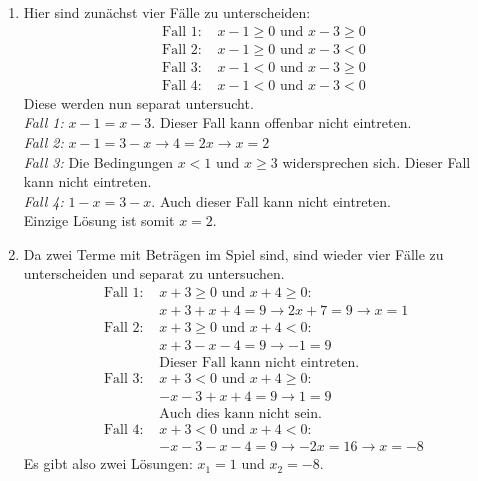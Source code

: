 \begin{enumerate}[label=\alph*)]
  \item Hier sind zunächst vier Fälle zu unterscheiden:
    \begin{align*}
      \text{Fall 1: } &x - 1 \geq 0 \text{ und } x - 3 \geq 0\\
      \text{Fall 2: } &x - 1 \geq 0 \text{ und } x - 3 < 0\\
      \text{Fall 3: } &x - 1 < 0 \text{ und } x - 3 \geq 0\\
      \text{Fall 4: } &x - 1 < 0 \text{ und } x - 3 < 0
    \end{align*}
    Diese werden nun separat untersucht.\\
    \textit{Fall 1: } $x - 1 = x - 3$. Dieser Fall kann offenbar nicht eintreten.\\
    \textit{Fall 2: } $x - 1 = 3 - x \rightarrow 4 = 2x \rightarrow x = 2$\\
    \textit{Fall 3: } Die Bedingungen $x < 1$ und $x \geq 3$ widersprechen sich. Dieser Fall kann nicht eintreten.\\
    \textit{Fall 4: } $1 - x = 3 - x$. Auch dieser Fall kann nicht eintreten.\\
    Einzige Lösung ist somit $x = 2$.
  \item Da zwei Terme mit Beträgen im Spiel sind, sind wieder vier Fälle zu unterscheiden und separat zu untersuchen.
    \begin{align*}
      \text{Fall 1: } &x + 3 \geq 0 \text{ und } x + 4 \geq 0:\\
      &x + 3 + x + 4 = 9 \rightarrow 2x + 7 = 9 \rightarrow x = 1\\
      \text{Fall 2: } &x + 3 \geq 0 \text{ und } x + 4 < 0:\\
      &x + 3 - x - 4 = 9 \rightarrow -1 = 9\\
      &\text{Dieser Fall kann nicht eintreten.}\\
      \text{Fall 3: } &x + 3 < 0 \text{ und } x + 4 \geq 0:\\
      &-x - 3 + x + 4 = 9 \rightarrow 1 = 9\\
      &\text{Auch dies kann nicht sein.}\\
      \text{Fall 4: } &x + 3 < 0 \text{ und } x + 4 < 0:\\
      &-x - 3 - x - 4 = 9 \rightarrow -2x = 16 \rightarrow x = -8
    \end{align*}
    Es gibt also zwei Lösungen: $x_1 = 1$ und $x_2 = -8$.
\end{enumerate}
